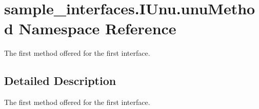 \hypertarget{namespacesample__interfaces_1_1_i_unu_1_1unu_method}{\section{sample\-\_\-interfaces.\-I\-Unu.\-unu\-Method Namespace Reference}
\label{namespacesample__interfaces_1_1_i_unu_1_1unu_method}
}


The first method offered for the first interface.  




\subsection{Detailed Description}
The first method offered for the first interface. 
